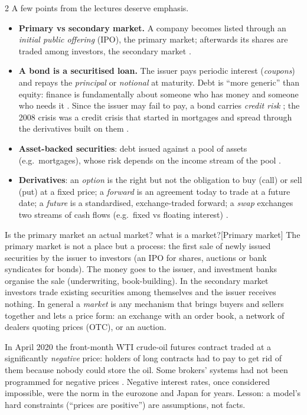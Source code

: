 \begin{paracol}{2}
A few points from the lectures deserve emphasis.
\begin{itemize}
  \item \textbf{Primary vs secondary market.} A company becomes listed through an
        \emph{initial public offering} (IPO), the primary market; afterwards its shares are
        traded among investors, the secondary market .
  \item \textbf{A bond is a securitised loan.} The issuer pays periodic interest
        (\emph{coupons}) and repays the \emph{principal} or \emph{notional} at maturity.
        Debt is ``more generic'' than equity: finance is fundamentally about someone who has
        money and someone who needs it . Since the issuer may fail to pay,
        a bond carries \emph{credit risk} ; the 2008 crisis was a credit crisis
        that started in mortgages and spread through the derivatives built on them
        .
  \item \textbf{Asset-backed securities}: debt issued against a pool of assets (e.g.\ mortgages),
        whose risk depends on the income stream of the pool .
  \item \textbf{Derivatives}: an \emph{option} is the right but not the obligation to buy
        (call) or sell (put) at a fixed price; a \emph{forward} is an agreement today to trade
        at a future date; a \emph{future} is a standardised, exchange-traded forward; a
        \emph{swap} exchanges two streams of cash flows (e.g.\ fixed vs floating interest)
        .
\end{itemize}
\begin{answer}{Is the primary market an actual market? what is a market?}[Primary market]
The primary market is not a place but a process: the first sale of newly issued securities by
the issuer to investors (an IPO for shares, auctions or bank syndicates for bonds). The money goes to
the issuer, and investment banks organise the sale (underwriting, book-building). In the secondary
market investors trade existing securities among themselves and the issuer receives nothing.
In general a \emph{market} is any mechanism that brings buyers and sellers together and lets a price
form: an exchange with an order book, a network of dealers quoting prices (OTC), or an auction.
\end{answer}

\begin{finance}
In April 2020 the front-month WTI crude-oil futures contract traded at a significantly
\emph{negative} price: holders of long contracts had to pay to get rid of them because nobody
could store the oil. Some brokers' systems had not been programmed for negative prices
. Negative interest rates, once considered impossible, were the norm in the
eurozone and Japan for years. Lesson: a model's hard constraints (``prices are positive'') are
assumptions, not facts.
\end{finance}


\end{paracol}
